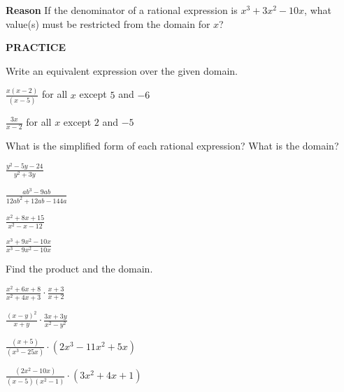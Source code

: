 \documentclass{article}
\newenvironment{practice}[2]{}{}
\begin{document}
\begin{practice}{19}{1}
\textbf{Reason} If the denominator of a rational expression is $x^3 + 3x^2 - 10x$, what value(s) must be restricted from the domain for $x$?
\end{practice}

\textbf{PRACTICE}

Write an equivalent expression over the given domain.

\begin{practice}{20}{1}
$\frac{x(x - 2)}{(x - 5)}$ for all $x$ except $5$ and $-6$
\end{practice}

\begin{practice}{21}{1}
$\frac{3x}{x - 2}$ for all $x$ except $2$ and $-5$
\end{practice}

What is the simplified form of each rational expression? What is the domain?

\begin{practice}{22}{1}
$\frac{y^2 - 5y - 24}{y^2 + 3y}$
\end{practice}

\begin{practice}{23}{1}
$\frac{ab^3 - 9ab}{12ab^2 + 12ab - 144a}$
\end{practice}

\begin{practice}{24}{1}
$\frac{x^2 + 8x + 15}{x^2 - x - 12}$
\end{practice}

\begin{practice}{25}{1}
$\frac{x^3 + 9x^2 - 10x}{x^3 - 9x^2 - 10x}$
\end{practice}

Find the product and the domain.

\begin{practice}{26}{1}
$\frac{x^2 + 6x + 8}{x^2 + 4x + 3} \cdot \frac{x + 3}{x + 2}$
\end{practice}

\begin{practice}{27}{1}
$\frac{(x - y)^2}{x + y} \cdot \frac{3x + 3y}{x^2 - y^2}$
\end{practice}

\begin{practice}{28}{1}
$\frac{(x + 5)}{(x^3 - 25x)} \cdot (2x^3 - 11x^2 + 5x)$
\end{practice}

\begin{practice}{29}{1}
$\frac{(2x^2 - 10x)}{(x - 5)(x^2 - 1)} \cdot (3x^2 + 4x + 1)$
\end{practice}
\end{document}
